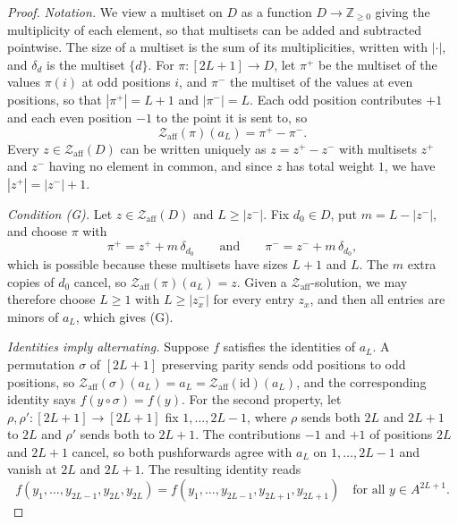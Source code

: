 \documentclass[11pt]{article}
\theoremstyle{plain}
\theoremstyle{definition}
\newcommand{\id}{\mathrm{id}}
\newcommand{\Z}{\mathbb{Z}}
\newcommand{\Za}{\mathscr{Z}_{\mathrm{aff}}}
\begin{document}
\begin{proof}
\emph{Notation.} We view a multiset on $D$ as a function $D\to\Z_{\geq0}$ giving the multiplicity of each element, so that multisets can be added and subtracted pointwise. The size of a multiset is the sum of its multiplicities, written with $|\cdot|$, and $\delta_d$ is the multiset $\{d\}$. For $\pi\colon[2L+1]\to D$, let $\pi^+$ be the multiset of the values $\pi(i)$ at odd positions $i$, and $\pi^-$ the multiset of the values at even positions, so that $|\pi^+|=L+1$ and $|\pi^-|=L$. Each odd position contributes $+1$ and each even position $-1$ to the point it is sent to, so
\[
\Za(\pi)(a_L)=\pi^+-\pi^-.
\]
Every $z\in\Za(D)$ can be written uniquely as $z=z^+-z^-$ with multisets $z^+$ and $z^-$ having no element in common, and since $z$ has total weight $1$, we have $|z^+|=|z^-|+1$.

\emph{Condition (G).} Let $z\in\Za(D)$ and $L\geq|z^-|$. Fix $d_0\in D$, put $m=L-|z^-|$, and choose $\pi$ with
\[
\pi^+=z^++m\,\delta_{d_0}\qquad\text{and}\qquad \pi^-=z^-+m\,\delta_{d_0},
\]
which is possible because these multisets have sizes $L+1$ and $L$. The $m$ extra copies of $d_0$ cancel, so $\Za(\pi)(a_L)=z$. Given a $\Za$-solution, we may therefore choose $L\geq1$ with $L\geq|z_x^-|$ for every entry $z_x$, and then all entries are minors of $a_L$, which gives (G).

\emph{Identities imply alternating.} Suppose $f$ satisfies the identities of $a_L$. A permutation $\sigma$ of $[2L+1]$ preserving parity sends odd positions to odd positions, so $\Za(\sigma)(a_L)=a_L=\Za(\id)(a_L)$, and the corresponding identity says $f(y\circ\sigma)=f(y)$. For the second property, let $\rho,\rho'\colon[2L+1]\to[2L+1]$ fix $1,\dots,2L-1$, where $\rho$ sends both $2L$ and $2L+1$ to $2L$ and $\rho'$ sends both to $2L+1$. The contributions $-1$ and $+1$ of positions $2L$ and $2L+1$ cancel, so both pushforwards agree with $a_L$ on $1,\dots,2L-1$ and vanish at $2L$ and $2L+1$. The resulting identity reads
\[
f(y_1,\dots,y_{2L-1},y_{2L},y_{2L})=f(y_1,\dots,y_{2L-1},y_{2L+1},y_{2L+1})\quad\text{for all } y\in A^{2L+1}.
\]


\end{proof}
\end{document}
